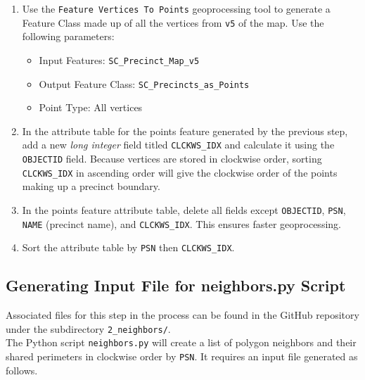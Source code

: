 \documentclass[11pt]{article}
\begin{document}
\begin{enumerate}
\item Use the \verb|Feature Vertices To Points| geoprocessing tool to generate a Feature Class made up of all the vertices from \verb|v5| of the map. Use the following parameters:
\begin{itemize}
	\item Input Features: \verb|SC_Precinct_Map_v5|
	\item Output Feature Class: \verb|SC_Precincts_as_Points|
	\item Point Type: All vertices
\end{itemize}
\item In the attribute table for the points feature generated by the previous step, add a new \textit{long integer} field titled \verb|CLCKWS_IDX| and calculate it using the \verb|OBJECTID| field. Because vertices are stored in clockwise order, sorting \verb|CLCKWS_IDX| in ascending order will give the clockwise order of the points making up a precinct boundary.
\item In the points feature attribute table, delete all fields except \verb|OBJECTID|, \verb|PSN|, \verb|NAME| (precinct name), and \verb|CLCKWS_IDX|. This ensures faster geoprocessing.
\item Sort the attribute table by \verb|PSN| then \verb|CLCKWS_IDX|.
\end{enumerate}

\subsection{Generating Input File for neighbors.py Script}

Associated files for this step in the process can be found in the GitHub repository under the subdirectory \verb|2_neighbors/|.\\

The Python script \verb|neighbors.py| will create a list of polygon neighbors and their shared perimeters in clockwise order by \verb|PSN|. It requires an input file generated as follows.
\end{document}
